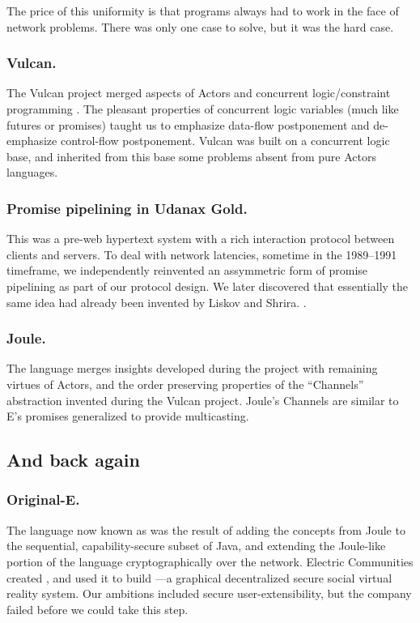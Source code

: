 \documentclass{llncs}
\begin{document}
The price of this uniformity is that programs always had to work in
the face of network problems. There was only one case to solve, but it
was the hard case.

\subsubsection{Vulcan.} The Vulcan project \cite{kahn:vulcan}
merged aspects of Actors and concurrent logic/constraint programming
\cite{tr003,Saraswat93,janus}. The pleasant properties of concurrent
logic variables (much like futures or promises) taught us to emphasize
data-flow postponement and de-emphasize control-flow
postponement. Vulcan was built on a concurrent logic base, and
inherited from this base some problems absent from pure Actors
languages.

\subsubsection{Promise pipelining in Udanax Gold.} This was a
pre-web hypertext system with a rich interaction protocol between
clients and servers. To deal with network latencies, sometime in the
1989--1991 timeframe, we independently reinvented an assymmetric form
of promise pipelining as part of our protocol design. We later
discovered that essentially the same idea had already been invented by
Liskov and Shrira. \cite{liskov:promises}.

\subsubsection{Joule.} The  language \cite{tribble:joule}
merges insights developed during the  project with
remaining virtues of Actors, and the order preserving properties of
the ``Channels'' abstraction \cite{tribble:channels} invented during
the Vulcan project. Joule's Channels are similar to E's promises
generalized to provide multicasting.

\subsection{And back again}

\subsubsection{Original-E.} The language now known as
 was the result of adding the concepts from Joule to
the sequential, capability-secure subset of Java, and extending the
Joule-like portion of the language cryptographically over the
network. Electric Communities created , and used it to
build ---a graphical decentralized secure social virtual
reality system. Our ambitions included secure user-extensibility, but
the company failed before we could take this step.
\end{document}

